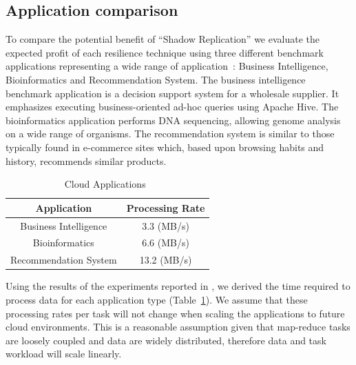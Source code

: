 \subsection{Application comparison}

To compare the potential benefit of ``Shadow Replication'' we evaluate
the expected profit of each resilience technique using three different
benchmark applications representing a wide range of
application~\cite{mrbs}: Business Intelligence, Bioinformatics and
Recommendation System. The business intelligence benchmark application
is a decision support system for a wholesale supplier. It emphasizes
executing business-oriented ad-hoc queries using Apache Hive. The
bioinformatics application performs DNA sequencing, allowing genome
analysis on a wide range of organisms. The recommendation system is
similar to those typically found in e-commerce sites which, based upon
browsing habits and history, recommends similar
products.

\begin{table}[h]
	\centering
		\begin{tabular}{|c|c|}
			\hline
			Application               & Processing Rate \\
			\hline
			Business Intelligence     & 3.3 (MB/s)      \\ 
			Bioinformatics            & 6.6 (MB/s)      \\ 
			Recommendation System     & 13.2 (MB/s)     \\
			\hline
                \end{tabular}
	\caption{Cloud Applications~\cite{mrbs}}
	\label{tbl:application_processing_rates}
\end{table}

Using the results of the experiments reported in \cite{mrbs}, we
derived the time required to process data for each application type (Table~\ref{tbl:application_processing_rates}). We assume that
these processing rates per task will not change when scaling the
applications to future cloud environments. This is a reasonable
assumption given that map-reduce tasks are loosely coupled and data
are widely distributed, therefore data and task workload will scale
linearly.

